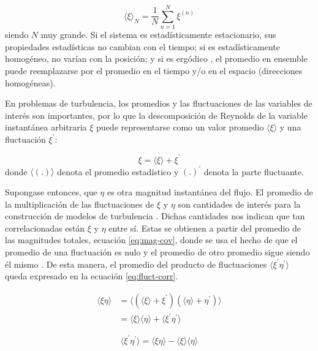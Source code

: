\begin{equation*}
\langle \xi \rangle_N = \frac{1}{N} \sum^N_{n=1} \xi^{(n)} 
\end{equation*}
siendo $N$ muy grande. Si el sistema es estadísticamente estacionario, sus propiedades estadísticas no cambian con el tiempo; si es estadísticamente homogéneo, no varían con la posición; y si es ergódico \cite{moser2003}, el promedio en ensemble puede reemplazarse por el promedio en el tiempo y/o en el espacio (direcciones homogéneas). 

En problemas de turbulencia, los promedios y las fluctuaciones de las variables de interés son importantes, por lo que la descomposición de Reynolds \cite{pope2001turbulent, kundu} de la variable instantánea arbitraria $\xi$ puede representarse como un valor promedio $\langle \xi \rangle$ y una fluctuación $\xi^{\prime}$:

$$\xi = \langle \xi \rangle + \xi^{\prime}$$
donde $\langle (\text{.}) \rangle$ denota el promedio estadístico y $(\text{.})^{\prime}$ denota la parte fluctuante. 

Supongase entonces, que $\eta$ es otra magnitud instantánea del flujo. El promedio de la multiplicación  de las fluctuaciones de $\xi$ y $\eta$ son cantidades de interés para la construcción de modelos de turbulencia \cite{pope2001turbulent}. Dichas cantidades nos indican que tan correlacionadas están $\xi$ y $\eta$ entre sí. Estas se obtienen a partir del promedio de las magnitudes totales, ecuación \ref{eq:mag-cov}, donde se usa el hecho de que el promedio de una fluctuación es nulo y el promedio de otro promedio sigue siendo él mismo \cite{pope2001turbulent}. De esta manera, el promedio del producto de fluctuaciones $\langle \xi^{\prime} \eta^{\prime} \rangle$ queda expresado en la ecuación \ref{eq:fluct-corr}.

\begin{equation}
\begin{aligned}
\langle \xi \eta \rangle &= \langle (\langle \xi \rangle + \xi^{\prime}) (\langle \eta \rangle + \eta^{\prime}) \rangle \\
                         &= \langle \xi \rangle \langle \eta \rangle + \langle \xi^{\prime} \eta^{\prime} \rangle
\end{aligned}
\label{eq:mag-cov}
\end{equation}

\begin{equation}
\langle \xi^{\prime} \eta^{\prime} \rangle = \langle \xi \eta \rangle - \langle \xi \rangle \langle \eta \rangle
\label{eq:fluct-corr}
\end{equation}

